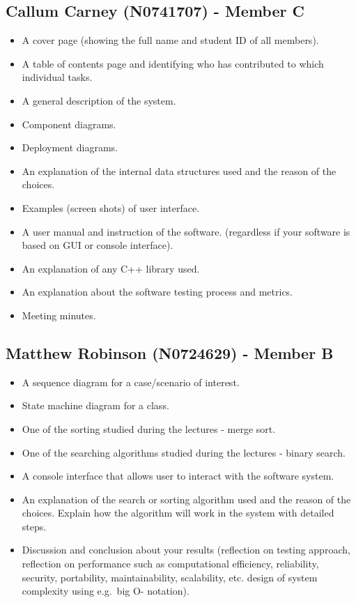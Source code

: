 \documentclass[
  english,
  a4paper,
,tablecaptionabove
]{scrartcl}
\providecommand{\tightlist}{%
  \setlength{\itemsep}{0pt}\setlength{\parskip}{0pt}}
\begin{document}
\hypertarget{callum-carney-n0741707---member-c}{%
\subsection{Callum Carney (N0741707) - Member
C}\label{callum-carney-n0741707---member-c}}

\begin{itemize}
\tightlist
\item
  A cover page (showing the full name and student ID of all members).
\item
  A table of contents page and identifying who has contributed to which
  individual tasks.
\item
  A general description of the system.
\item
  Component diagrams.
\item
  Deployment diagrams.
\item
  An explanation of the internal data structures used and the reason of
  the choices.
\item
  Examples (screen shots) of user interface.
\item
  A user manual and instruction of the software. (regardless if your
  software is based on GUI or console interface).
\item
  An explanation of any C++ library used.
\item
  An explanation about the software testing process and metrics.
\item
  Meeting minutes.
\end{itemize}

\hypertarget{matthew-robinson-n0724629---member-b}{%
\subsection{Matthew Robinson (N0724629) - Member
B}\label{matthew-robinson-n0724629---member-b}}

\begin{itemize}
\tightlist
\item
  A sequence diagram for a case/scenario of interest.
\item
  State machine diagram for a class.
\item
  One of the sorting studied during the lectures - merge sort.
\item
  One of the searching algorithms studied during the lectures - binary
  search.
\item
  A console interface that allows user to interact with the software
  system.
\item
  An explanation of the search or sorting algorithm used and the reason
  of the choices. Explain how the algorithm will work in the system with
  detailed steps.
\item
  Discussion and conclusion about your results (reflection on testing
  approach, reflection on performance such as computational efficiency,
  reliability, security, portability, maintainability, scalability, etc.
  design of system complexity using e.g.~big O- notation).
\end{itemize}
\end{document}
